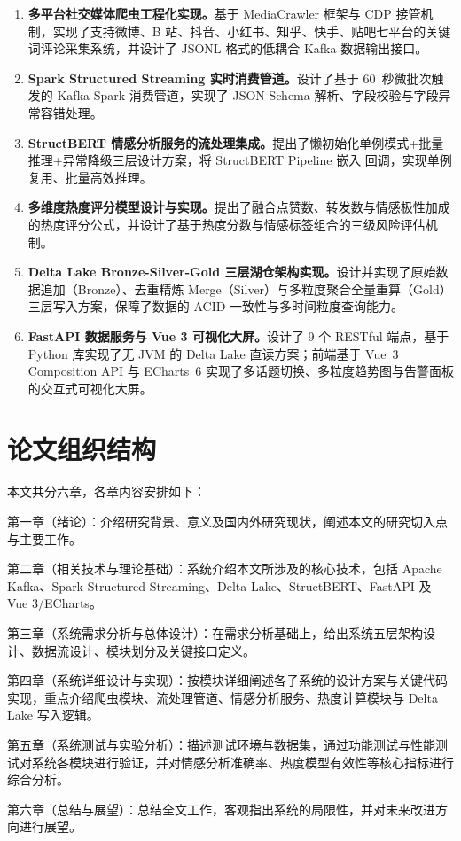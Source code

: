 \begin{enumerate}
  \item \textbf{多平台社交媒体爬虫工程化实现。}基于 MediaCrawler 框架与 CDP 接管机制，实现了支持微博、B 站、抖音、小红书、知乎、快手、贴吧七平台的关键词评论采集系统，并设计了 JSONL 格式的低耦合 Kafka 数据输出接口。

  \item \textbf{Spark Structured Streaming 实时消费管道。}设计了基于 60~秒微批次触发的 Kafka-Spark 消费管道，实现了 JSON Schema 解析、字段校验与字段异常容错处理。

  \item \textbf{StructBERT 情感分析服务的流处理集成。}提出了懒初始化单例模式+批量推理+异常降级三层设计方案，将 StructBERT Pipeline 嵌入  回调，实现单例复用、批量高效推理。

  \item \textbf{多维度热度评分模型设计与实现。}提出了融合点赞数、转发数与情感极性加成的热度评分公式，并设计了基于热度分数与情感标签组合的三级风险评估机制。

  \item \textbf{Delta Lake Bronze-Silver-Gold 三层湖仓架构实现。}设计并实现了原始数据追加（Bronze）、去重精炼 Merge（Silver）与多粒度聚合全量重算（Gold）三层写入方案，保障了数据的 ACID 一致性与多时间粒度查询能力。

  \item \textbf{FastAPI 数据服务与 Vue 3 可视化大屏。}设计了 9 个 RESTful 端点，基于  Python 库实现了无 JVM 的 Delta Lake 直读方案；前端基于 Vue~3 Composition API 与 ECharts~6 实现了多话题切换、多粒度趋势图与告警面板的交互式可视化大屏。
\end{enumerate}

\section{论文组织结构}

本文共分六章，各章内容安排如下：

第一章（绪论）：介绍研究背景、意义及国内外研究现状，阐述本文的研究切入点与主要工作。

第二章（相关技术与理论基础）：系统介绍本文所涉及的核心技术，包括 Apache Kafka、Spark Structured Streaming、Delta Lake、StructBERT、FastAPI 及 Vue 3/ECharts。

第三章（系统需求分析与总体设计）：在需求分析基础上，给出系统五层架构设计、数据流设计、模块划分及关键接口定义。

第四章（系统详细设计与实现）：按模块详细阐述各子系统的设计方案与关键代码实现，重点介绍爬虫模块、流处理管道、情感分析服务、热度计算模块与 Delta Lake 写入逻辑。

第五章（系统测试与实验分析）：描述测试环境与数据集，通过功能测试与性能测试对系统各模块进行验证，并对情感分析准确率、热度模型有效性等核心指标进行综合分析。

第六章（总结与展望）：总结全文工作，客观指出系统的局限性，并对未来改进方向进行展望。
